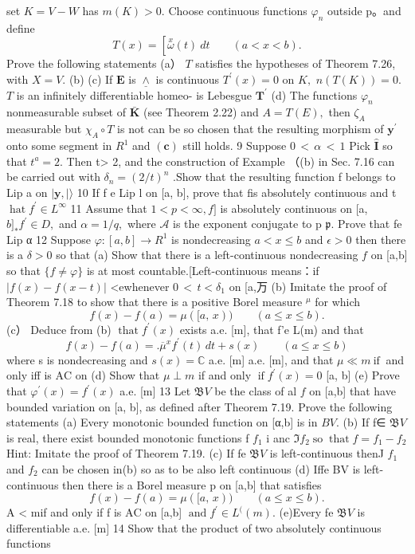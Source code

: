 set $K=V-W$ has $m(K)>0.$ Choose continuous functions $\varphi_{n}$ outside p。and define $$ T(x)=\left[\stackrel{x}{\omega}(t)\ d t\right.\qquad(a<x<b). $$ Prove the following statements (a） ${\mathbf{}}T$ satisfies the hypotheses of Theorem 7.26, with $X=V.$ (b) (c) If $\boldsymbol{E}$ is $\underline{{\land}}$ is continuous $T^{\prime}(x)=0$ on $K,$ $n(T(K))=0.$ ${\mathbf{}}T$ is an infinitely differentiable homeo- is Lebesgue ${\boldsymbol{T}}^{\prime}$ (d) The functions $\varphi_{n}$ nonmeasurable subset of ${\bar{\boldsymbol{K}}}$ (see Theorem 2.22) and $A=T(E),$ then $\zeta_{A}$ measurable but $\chi_{A}\circ T$ is not can be so chosen that the resulting morphism of ${\boldsymbol{y}}^{\prime}$ onto some segment in $R^{1}$ and $\mathbf{(c)}$ still holds. 9 Suppose $\scriptstyle0\,<\,\alpha\,<\,1$ Pick $\hat{\boldsymbol{I}}$ so that $t^{a}=2.$ Then t> 2, and the construction of Example （(b) in Sec. 7.16 can be carried out with $\delta_{n}=(2/t)^{n}$ .Show that the resulting function f belongs to Lip a on $\scriptstyle{|\mathbf{y},|\rangle}$ 10 If f e Lip l on [a, b], prove that fis absolutely continuous and t $\operatorname{hat}f^{\prime}\in L^{\infty}$ 11 Assume that $1<p<\infty,f]$ is absolutely continuous on [a, $b]_{*}f^{\prime}\in D,$ and $\alpha=1/q,$ where $\scriptstyle{\mathcal{A}}$ is the exponent conjugate to p ${\mathfrak{p}}.$ Prove that fe Lip α 12 Suppose $\varphi:\left[a,b\right]\to R^{1}$ is nondecreasing $a<x\leq b$ and $\epsilon>0$ then there is a $\delta>0$ so that (a) Show that there is a left-continuous nondecreasing $\scriptstyle f$ on [a,b] so that $\{f\neq\varphi\}$ is at most countable.[Left-continuous means：if $|f(x)-f(x-t)|$ <ewhenever $\scriptstyle0\,<\,t<\delta_{1}$ on [a,万 (b) Imitate the proof of Theorem 7.18 to show that there is a positive Borel measure ${}^{\mu}$ for which $$ f(x)-f(a)=\mu([a,\,x))\qquad(a\leq x\leq b). $$ (c） Deduce from (b) $\operatorname{that}f^{\prime}(x)$ exists a.e. [m], that f'e L(m) and that $$ f(x)-f(a)= .{\overline{{\mu}}}^{x}f^{\prime}(t)\,d t+s(x)\qquad(a\leq x\leq b) $$ where s is nondecreasing and $s(x)=\mathbb{C}$ a.e. [m] a.e. [m], and that $\mu\ll m{\mathrm{~if~}}$ and only iff is ${\mathrm{AC}}$ on (d) Show that $\mu\perp m$ if and only $\operatorname{if}f^{\prime}(x)=0$ [a, b] (e) Prove that $\varphi^{\prime}(x)=f^{\prime}(x)$ a.e. [m] 13 Let ${\mathfrak{B}}V$ be the class of al $\boldsymbol{\mathit{f}}$ on [a,b] that have bounded variation on [a, b], as defined after Theorem 7.19. Prove the following statements (a) Every monotonic bounded function on [α,b] is in $B V.$ (b) If f∈ ${\mathfrak{B}}V$ is real, there exist bounded monotonic functions f $f_{1}$ i anc ${\mathfrak{I}}f_{2}\operatorname{so}\operatorname{that}f=f_{1}-f_{2}$ Hint: Imitate the proof of Theorem 7.19. (c) If fe ${\mathfrak{B}}V$ is left-continuous thenJ $f_{1}$ and $f_{2}$ can be chosen in(b) so as to be also left continuous (d) Iffe BV is left-continuous then there is a Borel measure p on [a,b] that satisfies $$ f(x)-f(a)=\mu([a,\,x))\qquad(a\leq x\leq b). $$ A < mif and only if f is ${\mathrm{AC}}$ on [a,b] $\operatorname{and}f^{\prime}\in L^{(}(m).$ (e)Every fe ${\mathfrak{B}}V$ is differentiable a.e. [m] 14 Show that the product of two absolutely continuous functions 